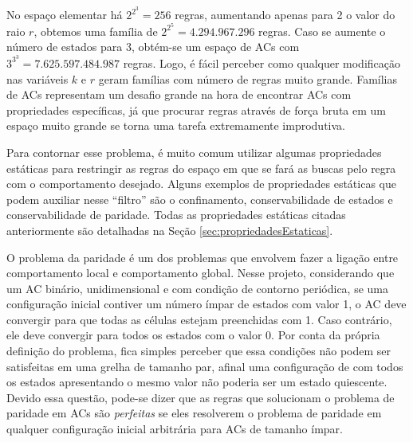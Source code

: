 No espaço elementar há $2^{2^{3}} = 256$ regras, aumentando apenas para 2 o valor do raio $r$, obtemos uma família de $2^{2^{5}} = 4.294.967.296$ regras. Caso se aumente o número de estados para 3, obtém-se um espaço de ACs com $3^{3^{3}} = 7.625.597.484.987$ regras. Logo, é fácil perceber como qualquer modificação nas variáveis $k$ e $r$ geram famílias com número de regras muito grande. Famílias de ACs representam um desafio grande na hora de encontrar ACs com propriedades específicas, já que procurar regras através de força bruta em um espaço muito grande se torna uma tarefa extremamente improdutiva.

Para contornar esse problema, é muito comum utilizar algumas propriedades estáticas para restringir as regras do espaço em que se fará as buscas pelo regra com o comportamento desejado. Alguns exemplos de propriedades estáticas que podem auxiliar nesse ``filtro'' são o confinamento, conservabilidade de estados e conservabilidade de paridade. Todas as propriedades estáticas citadas anteriormente são detalhadas na Seção \ref{sec:propriedadesEstaticas}.

O problema da paridade é um dos problemas que envolvem fazer a ligação entre comportamento local e comportamento global. Nesse projeto, considerando que um AC binário, unidimensional e com condição de contorno periódica, se uma configuração inicial contiver um número ímpar de estados com valor 1, o AC deve convergir para que todas as células estejam preenchidas com 1. Caso contrário, ele deve convergir para todos os estados com o valor 0. Por conta da própria definição do problema, fica simples perceber que essa condições não podem ser satisfeitas em uma grelha de tamanho par, afinal uma configuração de com todos os estados apresentando o mesmo valor não poderia ser um estado quiescente. Devido essa questão, pode-se dizer que as regras que solucionam o problema de paridade em ACs são \textit{perfeitas} se eles resolverem o problema de paridade em qualquer configuração inicial arbitrária para ACs de tamanho ímpar. 

